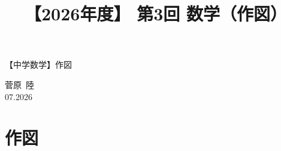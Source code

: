 \documentclass[12pt,a4paper]{jsarticle}
\title{【2026年度】 第3回 数学（作図）}
\author{}
\date{}
\begin{document}
\begin{center}
{\LARGE 【中学数学】作図}
\end{center}

\vspace{5mm}
\begin{flushright}
  菅原\ 陸\\[1.2em]
  07.2026
\end{flushright}

\section{作図}



\bookletpadpages
\end{document}
